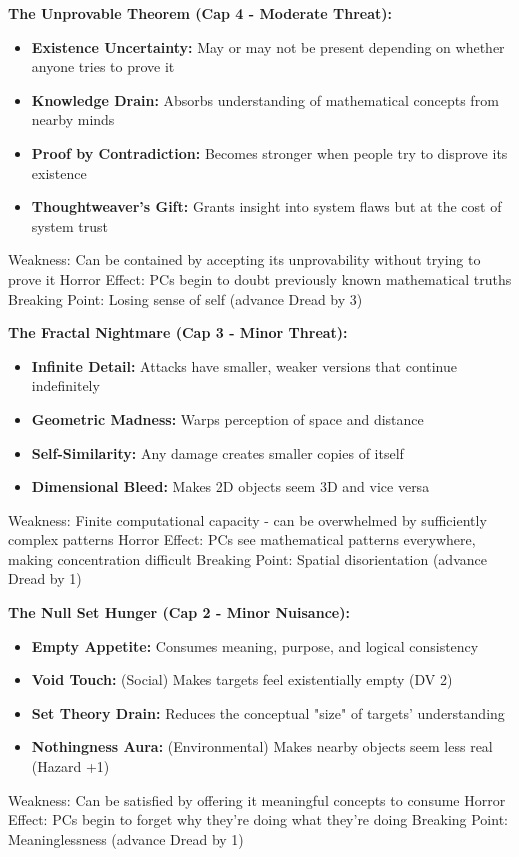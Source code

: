\documentclass[11pt]{article}
\begin{document}
\textbf{The Unprovable Theorem (Cap 4 - Moderate Threat):}
\begin{itemize}
    \item \textbf{Existence Uncertainty:} May or may not be present depending on whether anyone tries to prove it
    \item \textbf{Knowledge Drain:} Absorbs understanding of mathematical concepts from nearby minds
    \item \textbf{Proof by Contradiction:} Becomes stronger when people try to disprove its existence
    \item \textbf{Thoughtweaver's Gift:} Grants insight into system flaws but at the cost of system trust
\end{itemize}
Weakness: Can be contained by accepting its unprovability without trying to prove it
Horror Effect: PCs begin to doubt previously known mathematical truths
Breaking Point: Losing sense of self (advance Dread by 3)

\textbf{The Fractal Nightmare (Cap 3 - Minor Threat):}
\begin{itemize}
    \item \textbf{Infinite Detail:} Attacks have smaller, weaker versions that continue indefinitely
    \item \textbf{Geometric Madness:} Warps perception of space and distance
    \item \textbf{Self-Similarity:} Any damage creates smaller copies of itself
    \item \textbf{Dimensional Bleed:} Makes 2D objects seem 3D and vice versa
\end{itemize}
Weakness: Finite computational capacity - can be overwhelmed by sufficiently complex patterns
Horror Effect: PCs see mathematical patterns everywhere, making concentration difficult
Breaking Point: Spatial disorientation (advance Dread by 1)

\textbf{The Null Set Hunger (Cap 2 - Minor Nuisance):}
\begin{itemize}
    \item \textbf{Empty Appetite:} Consumes meaning, purpose, and logical consistency
    \item \textbf{Void Touch:} (Social) Makes targets feel existentially empty (DV 2)
    \item \textbf{Set Theory Drain:} Reduces the conceptual "size" of targets' understanding
    \item \textbf{Nothingness Aura:} (Environmental) Makes nearby objects seem less real (Hazard +1)
\end{itemize}
Weakness: Can be satisfied by offering it meaningful concepts to consume
Horror Effect: PCs begin to forget why they're doing what they're doing
Breaking Point: Meaninglessness (advance Dread by 1)
\end{document}
